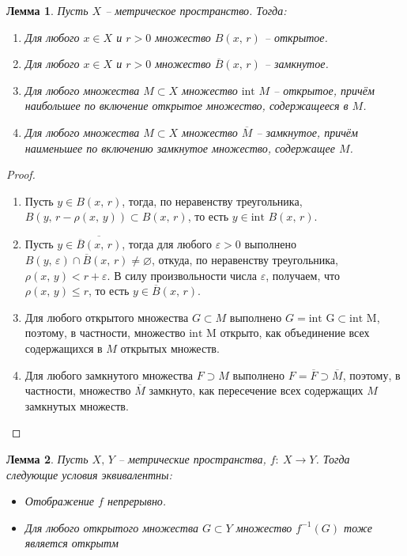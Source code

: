 \documentclass[a4paper,12pt]{article}
\renewcommand{\leq}{\ensuremath{\leqslant}}
\renewcommand{\emptyset}{\ensuremath{\varnothing}}
\theoremstyle{plain}
\newtheorem{lemma}{Лемма}[section]
\theoremstyle{definition}
\theoremstyle{remark}
\begin{document}
\begin{lemma}
	Пусть $X$ -- метрическое пространство. Тогда:
	\begin{enumerate}
		\item Для любого $x \in X$ и $r > 0$ множество $B(x,\,r)$ -- открытое.
		\item Для любого $x \in X$ и $r > 0$ множество $\overline{B}(x,\,r)$ -- замкнутое.
		\item Для любого множества $M \subset X$ множество $\text{int }M$ -- открытое, причём наибольшее по включение открытое множество, содержащееся в $M$.
		\item Для любого множества $M \subset X$ множество $\overline{M}$ -- замкнутое, причём наименьшее по включению замкнутое множество, содержащее $M$.
	\end{enumerate}
\end{lemma}

\begin{proof}
	\begin{enumerate}
		\item Пусть $y \in B(x,\,r)$, тогда, по неравенству треугольника, $B(y,\, r - \rho(x,\,y)) \subset B(x,\,r)$, то есть $y \in \text{int }B(x,\,r)$.
		\item Пусть $y \in \overline{\overline{B}(x,\,r)}$, тогда для любого $\varepsilon > 0$ выполнено $B(y,\,\varepsilon) \cap \overline{B}(x,\,r) \neq \emptyset$, откуда, по неравенству треугольника, $\rho(x,\,y) < r + \varepsilon$. В силу произвольности числа $\varepsilon$, получаем, что $\rho(x,\,y) \leq r$, то есть $y \in \overline{B}(x,\,r)$.
		\item Для любого открытого множества $G \subset M$ выполнено $G = \text{int G} \subset \text{int M}$, поэтому, в частности, множество $\text{int M}$ открыто, как объединение всех содержащихся в $M$ открытых множеств.
		\item Для любого замкнутого множества $F \supset M$ выполнено $F = \overline{F} \supset \overline{M}$, поэтому, в частности, множество $\overline{M}$ замкнуто, как пересечение всех содержащих $M$ замкнутых множеств.
	\end{enumerate}
\end{proof}

\begin{lemma}
	Пусть $X,\, Y$ -- метрические пространства, $f :\: X \to Y$. Тогда следующие условия эквивалентны:
	\begin{itemize}
		\item Отображение $f$ непрерывно.
		\item Для любого открытого множества $G \subset Y$ множество $f^{-1}(G)$ тоже является открытм
	\end{itemize}
\end{lemma}
\end{document}
